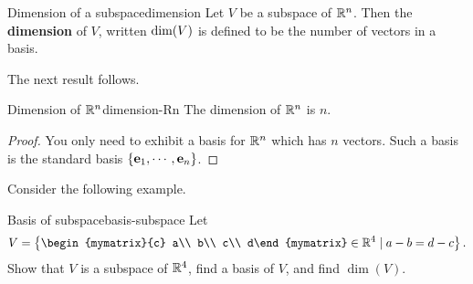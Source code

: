 \begin{definition}{Dimension of a subspace}{dimension}
  Let $V$ be a subspace of $\mathbb{R}^{n}$. Then the \textbf{dimension }of
  $V$, written $\mbox{\rm dim}(V)$ is defined to be the number of vectors
  in a basis.
\end{definition}

The next result follows.

\begin{corollary}{Dimension of $\mathbb{R}^n$}{dimension-Rn}
  The dimension of $\mathbb{R}^{n}$ is $n$.
\end{corollary}

\begin{proof}
  You only need to exhibit a basis for $\mathbb{R}^{n}$ which has $n$
  vectors. Such a basis is the standard basis
  $\left\{\mbox{\bf e}_{1},\cdots , \mbox{\bf e}_{n}\right\}$.
\end{proof}

Consider the following example.

\begin{example}{Basis of subspace}{basis-subspace}
  Let 
  \begin{equation*}
    V=\set{
      \begin{mymatrix}{c} a\\ b\\ c\\ d\end{mymatrix}\in\R^4 \mid
      a-b=d-c
    }.
  \end{equation*}
  Show that $V$ is a subspace of $\mathbb{R}^4$, find a basis of $V$, and find
  $\dim(V)$.
\end{example}

